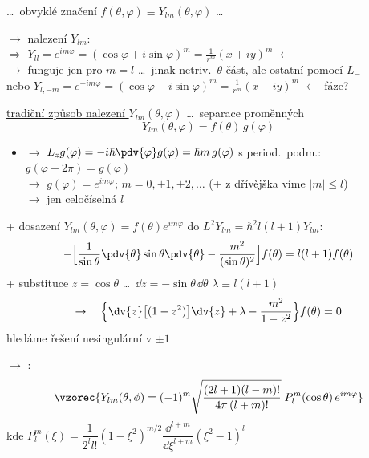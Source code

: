 \dots\ obvyklé značení \quad $f(\theta,\varphi) \equiv Y_{lm}(\theta,\varphi)$ \quad \dots \quad
{\color{gray}}

$\to$ nalezení $Y_{lm}$: \quad {} \\
{\color{gray}
\quad $\Rightarrow$ \quad $Y_{ll} = e^{im\varphi} = (\cos\varphi + i\sin\varphi)^m = \frac{1}{r^m}(x+iy)^m$ \quad $\leftarrow$ \\
\quad\quad $\to$ funguje jen pro $m = l$ \dots\ jinak netriv.\ $\theta$-část, ale ostatní pomocí $L_-$ \\
\quad nebo \quad $Y_{l,-m} = e^{-im\varphi} = (\cos\varphi - i\sin\varphi)^m = \frac{1}{r^m}(x-iy)^m$ \quad $\leftarrow$ \quad fáze?
}

\underline{tradiční způsob nalezení $Y_{lm}(\theta,\varphi)$} \dots\ separace proměnných
\[
  Y_{lm}(\theta,\varphi) = f(\theta)\,g(\varphi)
\]
\begin{itemize}
  \item $\to$ \quad $L_zg(\varphi) = -i\hbar\pdv{\varphi}g(\varphi) = \hbar m\,g(\varphi)$ \quad s period.\ podm.: $g(\varphi + 2\pi) = g(\varphi)$ \\
  $\to$ \quad $g(\varphi) = e^{im\varphi}$; \quad $m = 0,\pm1,\pm2,\dots$ \quad (+ z dřívějška víme $|m|\leq l$) \\
  \hspace*{6cm} $\to$ jen celočíselná $l$
\end{itemize}
+ dosazení $Y_{lm}(\theta,\varphi) = f(\theta)e^{im\varphi}$ do $L^2Y_{lm} = \hbar^2 l(l+1)Y_{lm}$:
\[
  -\Big[\frac{1}{\sin\theta}\pdv{\theta}\sin\theta\pdv{\theta} - \frac{m^2}{(\sin\theta)^2}\Big]f(\theta) = l(l+1)f(\theta)
\]
\hspace*{2cm} + substituce $z = \cos\theta$ \quad \dots\ $\dd z = -\sin\theta\,\dd\theta$ \hfill $\lambda\equiv l(l+1)$
\[
  \to\quad \Big\{\dv{z}\big[(1-z^2)\big]\dv{z} + \lambda - \frac{m^2}{1-z^2}\Big\}f(\theta) = 0
\]
\hspace*{6cm} hledáme řešení nesingulární v $\pm 1$

$\to$ :
\[
  \vzorec{Y_{lm}(\theta,\phi) = (-1)^m\sqrt{\frac{(2l+1)(l-m)!}{4\pi\,(l+m)!}}\;P_l^m(\cos\theta)\,e^{im\varphi}}
\]
\quad kde \quad $P_l^m(\xi) = \dfrac{1}{2^l l!}(1-\xi^2)^{m/2}\dfrac{\dd^{l+m}}{\dd\xi^{l+m}}(\xi^2 - 1)^l$

